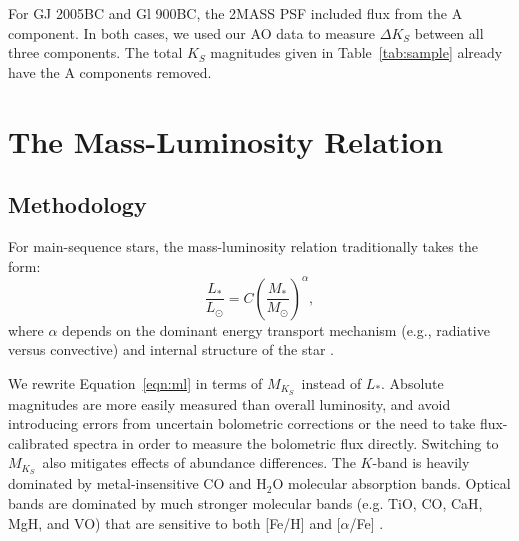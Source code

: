 \documentclass[twocolumn]{aastex62}
\newcommand{\mks}{$M_{K_S}$}
\begin{document}
For GJ 2005BC and Gl 900BC, the 2MASS PSF included flux from the A component. In both cases, we used our AO data to measure $\Delta K_S$ between all three components. The total $K_S$ magnitudes given in Table~\ref{tab:sample} already have the A components removed. 

\section{The Mass-Luminosity Relation}\label{sec:relation}

\subsection{Methodology}\label{sec:methods}

For main-sequence stars, the mass-luminosity relation traditionally takes the form:
\begin{equation}\label{eqn:ml}
\frac{L_*}{L_\odot} = C \left(\frac{M_*}{M_\odot}\right)^\alpha,
\end{equation}
where $\alpha$ depends on the dominant energy transport mechanism (e.g., radiative versus convective) and internal structure of the star \citep{2004sipp.book.....H}.

We rewrite Equation~\ref{eqn:ml} in terms of \mks\ instead of $L_*$. Absolute magnitudes are more easily measured than overall luminosity, and avoid introducing errors from uncertain bolometric corrections or the need to take flux-calibrated spectra in order to measure the bolometric flux directly. Switching to \mks\ also mitigates effects of abundance differences. The $K$-band is heavily dominated by metal-insensitive CO and H$_2$O molecular absorption bands. Optical bands are dominated by much stronger molecular bands (e.g. TiO, CO, CaH, MgH, and VO) that are sensitive to both [Fe/H] and [$\alpha$/Fe] \citep[Figure~\ref{fig:metal}, also see][]{Woolf:2006uq,Lepine:2007fk,Mann2013a}. 
\end{document}
